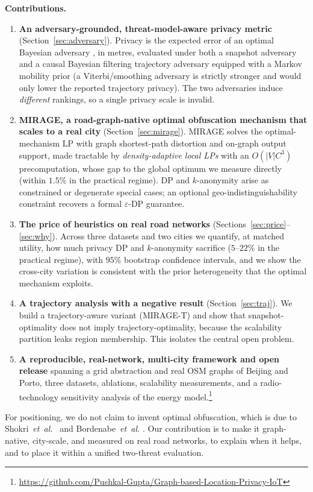 \documentclass[10pt,journal,compsoc]{IEEEtran}
\begin{document}
\noindent\textbf{Contributions.}
\begin{enumerate}
\item \textbf{An adversary-grounded, threat-model-aware privacy metric}
(Section~\ref{sec:adversary}). Privacy is the expected error of an optimal
Bayesian adversary \cite{shokri2011}, in metres, evaluated under both a snapshot
adversary and a causal Bayesian filtering trajectory adversary equipped with a
Markov mobility prior (a Viterbi/smoothing adversary is strictly stronger and would
only lower the reported trajectory privacy). The two adversaries induce
\emph{different} rankings, so a single privacy scale is invalid.
\item \textbf{MIRAGE, a road-graph-native optimal obfuscation mechanism that
scales to a real city} (Section~\ref{sec:mirage}). MIRAGE solves the
optimal-mechanism LP with graph shortest-path distortion and on-graph output
support, made tractable by \emph{density-adaptive local LPs} with an $O(|V|C^3)$
precomputation, whose gap to the global optimum we measure directly (within $1.5\%$
in the practical regime). DP and $k$-anonymity arise as
constrained or degenerate special cases; an optional geo-indistinguishability
constraint recovers a formal $\varepsilon$-DP guarantee.
\item \textbf{The price of heuristics on real road networks}
(Sections~\ref{sec:price}--\ref{sec:why}). Across three datasets and two cities we
quantify, at matched utility, how much privacy DP and $k$-anonymity sacrifice
($5$--$22\%$ in the practical regime), with $95\%$ bootstrap confidence intervals,
and we show the cross-city variation is consistent with the prior heterogeneity that
the optimal mechanism exploits.
\item \textbf{A trajectory analysis with a negative result}
(Section~\ref{sec:traj}). We build a trajectory-aware variant (MIRAGE-T) and show
that snapshot-optimality does not imply trajectory-optimality, because the
scalability partition leaks region membership. This isolates the central open
problem.
\item \textbf{A reproducible, real-network, multi-city framework and open release}
spanning a grid abstraction and real OSM graphs of Beijing and Porto, three
datasets, ablations, scalability measurements, and a radio-technology sensitivity
analysis of the energy model.\footnote{\url{https://github.com/Pushkal-Gupta/Graph-based-Location-Privacy-IoT}}
\end{enumerate}

For positioning, we do not claim to invent optimal obfuscation, which is due to
Shokri~\emph{et~al.}~\cite{shokri2012,shokri2015pets} and Bordenabe~\emph{et~al.}
\cite{bordenabe2014}. Our contribution is to make it graph-native, city-scale, and
measured on real road networks, to explain when it helps, and to place it within a
unified two-threat evaluation.
\end{document}
